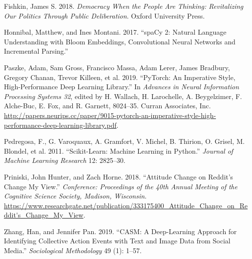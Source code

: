 \documentclass[12pt,]{article}
\begin{document}
\hypertarget{refs}{}
\leavevmode\hypertarget{ref-fishkin}{}%
Fishkin, James S. 2018. \emph{Democracy When the People Are Thinking:
Revitalizing Our Politics Through Public Deliberation}. Oxford
University Press.

\leavevmode\hypertarget{ref-spacy2}{}%
Honnibal, Matthew, and Ines Montani. 2017. ``spaCy 2: Natural Language
Understanding with Bloom Embeddings, Convolutional Neural Networks and
Incremental Parsing.''

\leavevmode\hypertarget{ref-pytorch}{}%
Paszke, Adam, Sam Gross, Francisco Massa, Adam Lerer, James Bradbury,
Gregory Chanan, Trevor Killeen, et al. 2019. ``PyTorch: An Imperative
Style, High-Performance Deep Learning Library.'' In \emph{Advances in
Neural Information Processing Systems 32}, edited by H. Wallach, H.
Larochelle, A. Beygelzimer, F. Alche-Buc, E. Fox, and R. Garnett,
8024--35. Curran Associates, Inc.
\url{http://papers.neurips.cc/paper/9015-pytorch-an-imperative-style-high-performance-deep-learning-library.pdf}.

\leavevmode\hypertarget{ref-scikit-learn}{}%
Pedregosa, F., G. Varoquaux, A. Gramfort, V. Michel, B. Thirion, O.
Grisel, M. Blondel, et al. 2011. ``Scikit-Learn: Machine Learning in
Python.'' \emph{Journal of Machine Learning Research} 12: 2825--30.

\leavevmode\hypertarget{ref-cmv}{}%
Priniski, John Hunter, and Zach Horne. 2018. ``Attitude Change on
Reddit's Change My View.'' \emph{Conference: Proceedings of the 40th
Annual Meeting of the Cognitive Science Society, Madison, Wisconsin}.
\url{https://www.researchgate.net/publication/333175400_Attitude_Change_on_Reddit's_Change_My_View}.

\leavevmode\hypertarget{ref-zhang}{}%
Zhang, Han, and Jennifer Pan. 2019. ``CASM: A Deep-Learning Approach for
Identifying Collective Action Events with Text and Image Data from
Social Media.'' \emph{Sociological Methodology} 49 (1): 1--57.





\newpage
\singlespacing 
\end{document}
